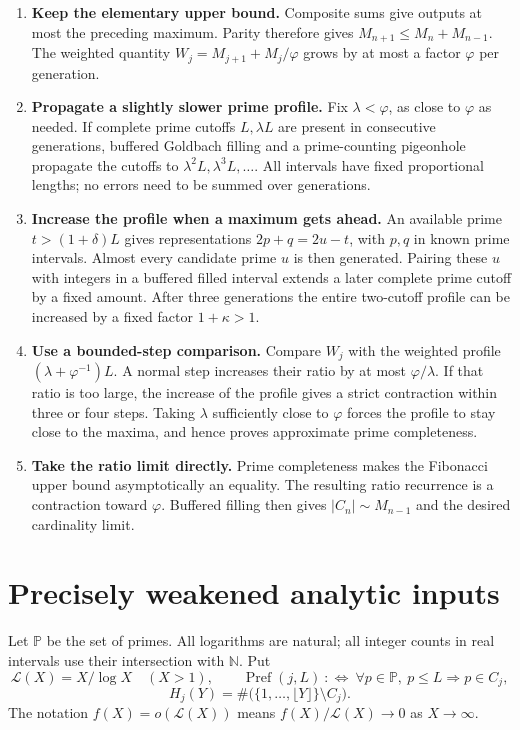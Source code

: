 \documentclass[11pt,letterpaper]{article}
\numberwithin{equation}{section}
\theoremstyle{remark}
\newcommand{\N}{\mathbb N}
\newcommand{\Pp}{\mathbb P}
\newcommand{\ph}{\varphi}
\newcommand{\floor}[1]{\lfloor #1\rfloor}
\begin{document}
\begin{enumerate}
\item \textbf{Keep the elementary upper bound.} Composite sums give outputs
at most the preceding maximum. Parity therefore gives
$M_{n+1}\le M_n+M_{n-1}$. The weighted quantity
$W_j=M_{j+1}+M_j/\ph$ grows by at most a factor $\ph$ per generation.

\item \textbf{Propagate a slightly slower prime profile.} Fix
$\lambda<\ph$, as close to $\ph$ as needed. If complete prime cutoffs
$L,\lambda L$ are present in consecutive generations, buffered Goldbach
filling and a prime-counting pigeonhole propagate the cutoffs to
$\lambda^2L,\lambda^3L,\ldots$. All intervals have fixed proportional
lengths; no errors need to be summed over generations.

\item \textbf{Increase the profile when a maximum gets ahead.} An available
prime $t>(1+\delta)L$ gives representations
$2p+q=2u-t$, with $p,q$ in known prime intervals. Almost every candidate
prime $u$ is then generated. Pairing these $u$ with integers in a buffered
filled interval extends a later complete prime cutoff by a fixed amount.
After three generations the entire two-cutoff profile can be increased
by a fixed factor $1+\kappa>1$.

\item \textbf{Use a bounded-step comparison.} Compare $W_j$ with the
weighted profile $(\lambda+\ph^{-1})L$. A normal step increases their
ratio by at most $\ph/\lambda$. If that ratio is too large, the increase
of the profile gives a strict contraction within three or four steps.
Taking $\lambda$ sufficiently close to $\ph$ forces the profile to stay
close to the maxima, and hence proves approximate prime completeness.

\item \textbf{Take the ratio limit directly.} Prime completeness makes
the Fibonacci upper bound asymptotically an equality. The resulting
ratio recurrence is a contraction toward $\ph$. Buffered filling then
gives $|C_n|\sim M_{n-1}$ and the desired cardinality limit.
\end{enumerate}

\section{Precisely weakened analytic inputs}\label{sec:inputs}

Let $\Pp$ be the set of primes. All logarithms are natural; all integer
counts in real intervals use their intersection with $\N$. Put
\[
 \mathcal L(X)=X/\log X\quad(X>1),\qquad
 \operatorname{Pref}(j,L)\ :\Longleftrightarrow\
       \forall p\in\Pp,\ p\le L\Longrightarrow p\in C_j,
\]
\[
 H_j(Y)=\#\bigl(\{1,\ldots,\floor Y\}\setminus C_j\bigr).
\]
The notation $f(X)=o(\mathcal L(X))$ means
$f(X)/\mathcal L(X)\to0$ as $X\to\infty$.
\end{document}

